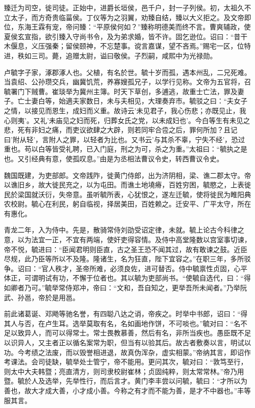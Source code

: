 \documentclass[12pt,UTF8]{ctexbook}
\begin{document}
臻迁为司空，徙司徒。正始中，进爵长垣侯，邑千户，封一子列侯。初，太祖久不立太子，而方奇贵临菑侯。丁仪等为之羽翼，劝臻自结，臻以大义拒之。及文帝即位，东海王霖有宠，帝问臻：“平原侯何如？”臻称明德美而终不言。曹爽辅政，使夏侯玄宣指，欲引臻入守尚书令，及为弟求婚，皆不许。固乞逊位。诏曰：“昔干木偃息，义压强秦；留侯颐神，不忘楚事。谠言嘉谋，望不吝焉。”赐宅一区，位特进，秩如三司。薨，追赠太尉，谥曰敬侯。子烈嗣，咸熙中为光禄勋。

卢毓字子家，涿郡涿人也。父植，有名於世。毓十岁而孤，遇本州乱，二兄死难。当袁绍、公孙瓒交兵，幽冀饥荒，养寡嫂孤兄子，以学行见称。文帝为五官将，召毓署门下贼曹。崔琰举为冀州主簿。时天下草创，多逋逃，故重士亡法，罪及妻子。亡士妻白等，始適夫家数日，未与夫相见，大理奏弃巿。毓驳之曰：“夫女子之情，以接见而恩生，成妇而义重。故诗云'未见君子，我心伤悲；亦既见止，我心则夷'。又礼'未庙见之妇而死，归葬女氏之党，以未成妇也'。今白等生有未见之悲，死有非妇之痛，而吏议欲肆之大辟，则若同牢合卺之后，罪何所加？且记曰'附从轻'，言附人之罪，以轻者为比也。又书云'与其杀不辜，宁失不经'，恐过重也。苟以白等皆受礼聘，已入门庭，刑之为可，杀之为重。”太祖曰：“毓执之是也。又引经典有意，使孤叹息。”由是为丞相法曹议令史，转西曹议令史。

魏国既建，为吏部郎。文帝践阼，徙黄门侍郎，出为济阴相，梁、谯二郡太守。帝以谯旧乡，故大徙民充之，以为屯田。而谯土地墝瘠，百姓穷困，毓愍之，上表徙民於梁国就沃衍，失帝意。虽听毓所表，心犹恨之，遂左迁毓，使将徙民为睢阳典农校尉。毓心在利民，躬自临视，择居美田，百姓赖之。迁安平、广平太守，所在有惠化。

青龙二年，入为侍中。先是，散骑常侍刘劭受诏定律，未就。毓上论古今科律之意，以为法宜一正，不宜有两端，使奸吏得容情。及侍中高堂隆数以宫室事切谏，帝不悦，毓进曰：“臣闻君明则臣直，古之圣王恐不闻其过，故有敢谏之鼓。近臣尽规，此乃臣等所以不及隆。隆诸生，名为狂直，陛下宜容之。”在职三年，多所驳争。诏曰：“官人秩才，圣帝所难，必须良佐，进可替否。侍中毓禀性贞固，心平体正，可谓明试有功，不懈于位者也。其以毓为吏部尚书。“使毓自选代，曰：“得如卿者乃可。”毓举常侍郑冲，帝曰：“文和，吾自知之，更举吾所未闻者。”乃举阮武、孙邕，帝於是用邕。

前此诸葛诞、邓飏等驰名誉，有四聪八达之诮，帝疾之。时举中书郎，诏曰：“得其人与否，在卢生耳。选举莫取有名，名如画地作饼，不可啖也。”毓对曰：“名不足以致异人，而可以得常士。常士畏教慕善，然后有名，非所当疾也。愚臣既不足以识异人，又主者正以循名案常为职，但当有以验其后。故古者敷奏以言，明试以功。今考绩之法废，而以毁誉相进退，故真伪浑杂，虚实相蒙。”帝纳其言，即诏作考课法。会司徒缺，毓举处士管宁，帝不能用。更问其次，毓对曰：“敦笃至行，则太中大夫韩暨；亮直清方，则司隶校尉崔林；贞固纯粹，则太常常林。”帝乃用暨。毓於人及选举，先举性行，而后言才。黄门李丰尝以问毓，毓曰：“才所以为善也，故大才成大善，小才成小善。今称之有才而不能为善，是才不中器也。”丰等服其言。
\end{document}

